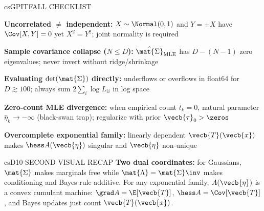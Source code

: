 \documentclass[../../../../master.tex]{subfiles}
\begin{document}
\begin{cscolumns}
\begin{cscard}{csG}{PITFALL CHECKLIST}
  \begin{csbul}
    \item \textbf{Uncorrelated $\neq$ independent:} $X\sim\Normal(0,1)$ and $Y=\pm X$ have $\Cov[X,Y]=0$ yet $X^2=Y^2$; joint normality is required
    \item \textbf{Sample covariance collapse ($N\le D$):} $\hat{\mat{\Sigma}}_{\mathrm{MLE}}$ has $D-(N-1)$ zero eigenvalues; never invert without ridge/shrinkage
    \item \textbf{Evaluating $\det(\mat{\Sigma})$ directly:} underflows or overflows in float64 for $D\gtrsim 100$; always sum $2\sum_i\log L_{ii}$ in log space
    \item \textbf{Zero-count MLE divergence:} when empirical count $\bar{t}_k=0$, natural parameter $\hat{\eta}_k\to -\infty$ (black-swan trap); regularize with prior $\vecb{\tau}_0>\zeros$
    \item \textbf{Overcomplete exponential family:} linearly dependent $\vecb{T}(\vecb{x})$ makes $\hess A(\vecb{\eta})$ singular and $\vecb{\eta}$ non-unique
  \end{csbul}
\end{cscard}

\begin{cscard}{csD}{10-SECOND VISUAL RECAP}
  \sffamily\footnotesize
  \textbf{Two dual coordinates:} for Gaussians, $\mat{\Sigma}$ makes marginals free while $\mat{\Lambda}=\mat{\Sigma}\inv$ makes conditioning and Bayes rule additive.
  For any exponential family, $A(\vecb{\eta})$ is a convex cumulant machine: $\grad A=\E[\vecb{T}]$, $\hess A=\Cov[\vecb{T}]$, and Bayes updates just count $\vecb{T}(\vecb{x})$.
\end{cscard}
\end{cscolumns}

\csend
\end{document}
